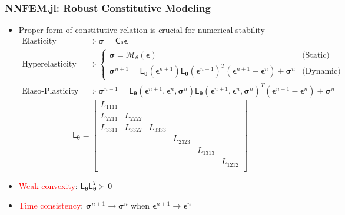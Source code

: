 \documentclass[usenames,dvipsnames]{beamer}
\newcommand{\ChoL}{\mathsf{L}}
\newcommand{\bt}[0]{\bm{\theta}}
\begin{document}
\begin{frame}
	\frametitle{NNFEM.jl: Robust Constitutive Modeling}
	\begin{itemize}
\item Proper form of constitutive relation is crucial for numerical stability
{\footnotesize\begin{align*}
 \mbox{Elasticity} &\Rightarrow \bm\sigma = \mathsf{C}_{\theta}\bm\epsilon \\
\mbox{Hyperelasticity } &\Rightarrow \begin{cases}\bm\sigma =\mathcal{M}_{\theta}(\bm\epsilon) & \mbox{(Static)} \\
\bm{\sigma}^{n+1}  =  \ChoL_{\bt}(\bm\epsilon^{n+1}) \ChoL_{\bt}(\bm\epsilon^{n+1})^T (\bm{\epsilon}^{n+1} - \bm{\epsilon}^{n})  + \bm{\sigma}^{n}  & \mbox{(Dynamic)} \end{cases} \\
	\mbox{Elaso-Plasticity} &\Rightarrow \bm\sigma^{n+1} = \ChoL_{\bt}(\bm\epsilon^{n+1},\bm{\epsilon}^{n},\bm{\sigma}^{n}) \ChoL_{\bt}(\bm\epsilon^{n+1},\bm{\epsilon}^{n},\bm{\sigma}^{n})^T (\bm{\epsilon}^{n+1} - \bm{\epsilon}^{n})  + \bm{\sigma}^{n} 
\end{align*}
}{\footnotesize$$\ChoL_{\bt} = \begin{bmatrix}
L_{1111}  &  & &  &       &\\
L_{2211}  & L_{2222} & &   & &\\
 L_{3311}  &  L_{3322}               & L_{3333} &  & &\\
               &                 &                 & L_{2323}&  &\\
              &               &                  &                & L_{1313} &\\
              &                 &                  &                &                 &L_{1212}\\
\end{bmatrix}$$}
	\item \textcolor{red}{Weak convexity}: $\ChoL_{\bt}\ChoL_{\bt}^T \succ 0$
	\item \textcolor{red}{Time consistency}:  $\bm\sigma^{n+1} \rightarrow \bm \sigma^n$ when $\bm\epsilon^{n+1} \rightarrow \bm \epsilon^n$
\end{itemize}

\end{frame}
\end{document}
